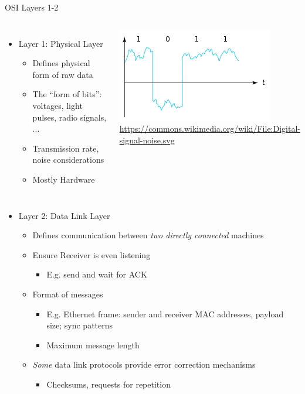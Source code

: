 \begin{frame}{OSI Layers 1-2}
%
\begin{columns}
\begin{itemize}
\item Layer 1: Physical Layer
	\begin{itemize}
	\item Defines physical form of raw data
	\item The \enquote{form of bits}: voltages, light pulses, radio signals, ...
	\item Transmission rate, noise considerations
	\item Mostly Hardware
	\end{itemize}
\end{itemize}
%
\includegraphics[width=\linewidth]{./gfx/20-Digital-signal-noise}
{\tiny {}
 \url{https://commons.wikimedia.org/wiki/File:Digital-signal-noise.svg}\\}
\end{columns}
\pause
%
\begin{itemize}
\item Layer 2: Data Link Layer
	\begin{itemize}
	\item Defines communication between \emph{two directly connected} machines
	\item Ensure Receiver is even listening
		\begin{itemize}
		\item E.\;g. send and wait for ACK
		\end{itemize}
	\item Format of messages
		\begin{itemize}
		\item E.\;g. Ethernet frame: sender and receiver MAC addresses, payload size; sync patterns
		\item Maximum message length
		\end{itemize}
	\item \emph{Some} data link protocols provide error correction mechanisms
		\begin{itemize}
		\item Checksums, requests for repetition
		\end{itemize}
	\end{itemize}
\end{itemize}
%
\end{frame}

